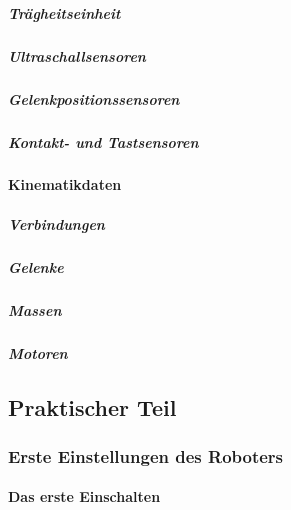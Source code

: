 \documentclass[12pt]{article}  %
\begin{document}
		\subsubsection{Trägheitseinheit}
		\subsubsection{Ultraschallsensoren}
		\subsubsection{Gelenkpositionssensoren}
		\subsubsection{Kontakt- und Tastsensoren}
	\subsection{Kinematikdaten}
		\subsubsection{Verbindungen}
		\subsubsection{Gelenke}
		\subsubsection{Massen}
		\subsubsection{Motoren}
			
	



\newpage
\null\vfill
\begin{center}
 \part[Praktischer Teil]{\centering Praktischer Teil} 
\end{center}
\vfill
\newpage

\section{Erste Einstellungen des Roboters}
	\subsection{Das erste Einschalten}
	






\newpage
\listoffigures
\end{document}
